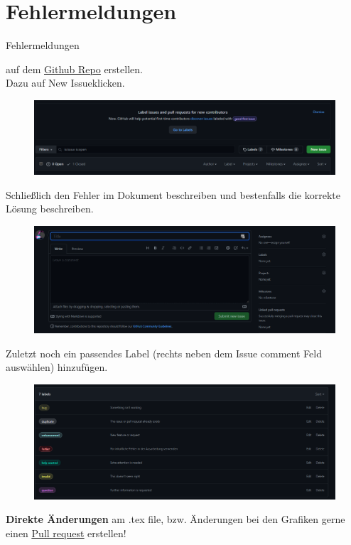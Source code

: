 \documentclass[a4paper, 11pt, ngerman, parskip=half-]{scrartcl}
\begin{document}
\section{Fehlermeldungen}
\label{sec:Fehler}
\hypertarget{Fehler}{Fehlermeldungen} auf dem \href{https://github.com/etschgi1/Ex2_Fragen/issues}{\underline{Github Repo}} erstellen.\\
Dazu auf \glqq New Issue\grqq klicken.
\begin{figure}[H]
    \centering
    \includegraphics[width=15cm]{image/Misc/Issues.png}
\end{figure}
Schließlich den Fehler im Dokument beschreiben und bestenfalls die korrekte Lösung beschreiben. 
\begin{figure}[H]
    \centering
    \includegraphics[width=15cm]{image/Misc/Issue_erstellen.png}
\end{figure}
Zuletzt noch ein passendes Label (rechts neben dem Issue comment Feld auswählen) hinzufügen.
\begin{figure}[H]
    \centering
    \includegraphics[width=15cm]{image/Misc/Labels.png}
\end{figure}
\vspace{5mm}
\textbf{Direkte Änderungen} am .tex file, bzw. Änderungen bei den Grafiken gerne einen \href{https://github.com/etschgi1/Ex2_Fragen/pulls}{\underline{Pull request}} erstellen!\\
\end{document}
